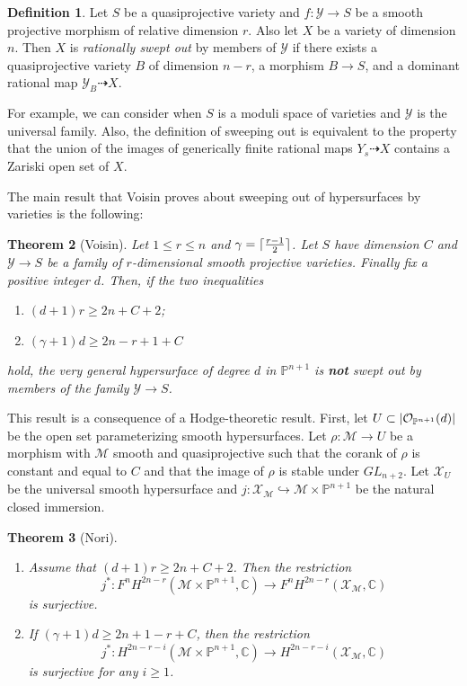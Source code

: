 \documentclass[leqno, openany]{memoir}
\DeclarePairedDelimiter{\ceil}{\lceil}{\rceil}
\newtheorem{thm}{Theorem}[section]
\theoremstyle{definition}
\newtheorem{defn}[thm]{Definition}
\theoremstyle{remark}
\theoremstyle{plain}
\theoremstyle{definition}
\theoremstyle{remark}
\newcommand{\C}{\mathbb{C}}
\renewcommand{\P}{\mathbb{P}}
\newcommand{\mc}[1]{\mathcal{#1}}
\begin{document}
\begin{defn}
    Let $S$ be a quasiprojective variety and $f \colon \mc{Y} \to S$ be a smooth projective morphism of relative dimension $r$. Also let $X$ be a variety of dimension $n$. Then $X$ is \textit{rationally swept out} by members of $\mc{Y}$ if there exists a quasiprojective variety $B$ of dimension $n-r$, a morphism $B \to S$, and a dominant rational map $\mc{Y}_B \dashrightarrow X$.
\end{defn}

For example, we can consider when $S$ is a moduli space of varieties and $\mc{Y}$ is the universal family. Also, the definition of sweeping out is equivalent to the property that the union of the images of generically finite rational maps $Y_s \dashrightarrow X$ contains a Zariski open set of $X$.

The main result that Voisin proves about sweeping out of hypersurfaces by varieties is the following:

\begin{thm}[Voisin]
    Let $1 \leq r \leq n$ and $\gamma = \ceil{\frac{r-1}{2}}$. Let $S$ have dimension $C$ and $\mc{Y} \to S$ be a family of $r$-dimensional smooth projective varieties. Finally fix a positive integer $d$. Then, if the two inequalities
    \begin{enumerate}[(1)]
        \item $(d+1) r \geq 2n + C + 2$;
        \item $(\gamma + 1) d \geq 2n - r + 1 + C$
    \end{enumerate}
    hold, the very general hypersurface of degree $d$ in $\P^{n+1}$ is \textbf{not} swept out by members of the family $\mc{Y} \to S$.
\end{thm}

This result is a consequence of a Hodge-theoretic result. First, let $U \subset \abs{\mc{O}_{\P^{n+1}}(d)}$ be the open set parameterizing smooth hypersurfaces. Let $\rho \colon \mc{M} \to U$ be a morphism with $\mc{M}$ smooth and quasiprojective such that the corank of $\rho$ is constant and equal to $C$ and that the image of $\rho$ is stable under $GL_{n+2}$. Let $\mc{X}_U$ be the universal smooth hypersurface and $j \colon \mc{X}_{\mc{M}} \hookrightarrow \mc{M} \times \P^{n+1}$ be the natural closed immersion.

\begin{thm}[Nori]\leavevmode
    \begin{enumerate}[(1)]
        \item Assume that $(d+1)r \geq 2n+C+2$. Then the restriction
            \[ j^* \colon F^n H^{2n-r}(\mc{M} \times \P^{n+1}, \C) \to F^n H^{2n-r}(\mc{X}_{\mc{M}}, \C) \]
            is surjective.
        \item If $(\gamma + 1) d \geq 2n+1-r+C$, then the restriction
            \[ j^* \colon H^{2n-r-i}(\mc{M} \times \P^{n+1}, \C) \to H^{2n-r-i}(\mc{X}_{\mc{M}}, \C) \]
            is surjective for any $i \geq 1$.
    \end{enumerate}
\end{thm}
\end{document}
